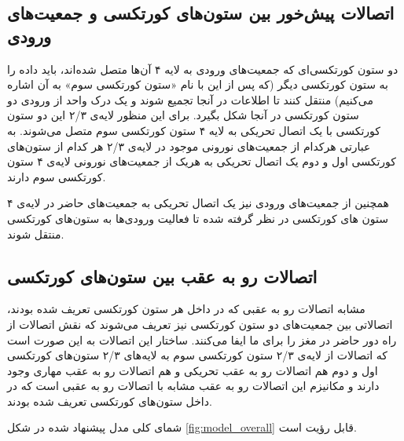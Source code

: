 \documentclass[12pt]{report}
\begin{document}
	
	\subsection{اتصالات پیش‌خور بین ستون‌های کورتکسی و جمعیت‌های ورودی}
	
	دو ستون کورتکسی‌ای که جمعیت‌های ورودی به لایه ۴ آن‌ها متصل شده‌اند، باید داده را به ستون کورتکسی دیگر (که پس از این با نام «ستون کورتکسی سوم» به آن اشاره می‌کنیم) منتقل کنند تا اطلاعات در آنجا تجمیع شوند و یک درک واحد از ورودی دو ستون کورتکسی در آنجا شکل بگیرد. برای این منظور لایه‌ی ۲/۳ این دو ستون کورتکسی با یک اتصال تحریکی به لایه ۴ ستون کورتکسی سوم متصل می‌شوند. به عبارتی هرکدام از جمعیت‌های نورونی موجود در لایه‌ی ۲/۳ هر کدام از ستون‌های کورتکسی اول و دوم یک اتصال تحریکی به هر‌یک از جمعیت‌های نورونی لایه‌ی ۴ ستون کورتکسی سوم دارند. 
	
	همچنین از جمعیت‌های ورودی نیز یک اتصال تحریکی به جمعیت‌های حاضر در لایه‌ی ۴ ستون ‌های کورتکسی در نظر گرفته شده تا فعالیت ورودی‌ها به ستون‌های کورتکسی منتقل شوند.
	
	\subsection{اتصالات رو‌ به عقب بین ستون‌های کورتکسی}
	
	مشابه اتصالات رو به عقبی که در داخل هر ستون کورتکسی تعریف شده بودند، اتصالاتی بین جمعیت‌های دو ستون کورتکسی نیز تعریف می‌شوند که نقش اتصالات از راه دور حاضر در مغز را برای ما ایفا می‌کنند. ساختار این اتصالات به این صورت است که اتصالات از لایه‌ی ۲/۳ ستون کورتکسی سوم به لایه‌های ۲/۳ ستون‌های کورتکسی اول و دوم هم اتصالات رو به عقب تحریکی و هم اتصالات رو به عقب مهاری وجود دارند و مکانیزم این اتصالات رو به عقب مشابه با اتصالات رو به عقبی است که در داخل ستون‌های کورتکسی تعریف شده بودند.
	
	شمای کلی مدل پیشنهاد شده در شکل \ref{fig:model_overall} قابل رؤیت است.
	
\end{document}
